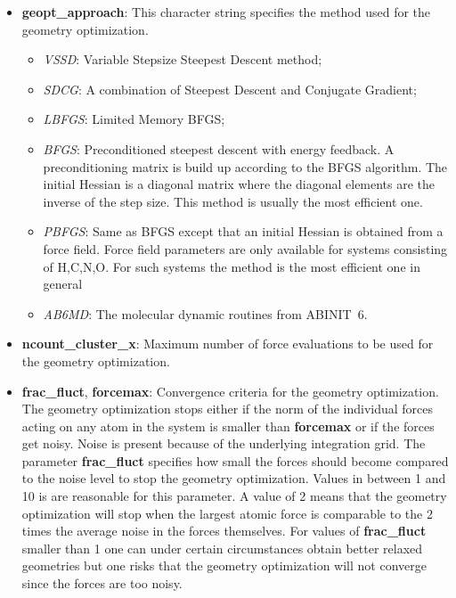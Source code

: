 \documentclass[a4paper,11pt]{report}
\begin{document}
\begin{itemize}
\item {\bf geopt\_approach}: This character string specifies the method used for the geometry optimization.
      \begin{itemize}
      \item  \emph{VSSD}:  Variable Stepsize Steepest Descent method;
      \item  \emph{SDCG}: A combination of Steepest Descent and Conjugate Gradient;
      \item  \emph{LBFGS}: Limited Memory BFGS;
      \item  \emph{BFGS}: Preconditioned steepest descent with energy feedback.
                          A preconditioning matrix is build up according to the  BFGS algorithm.
                          The initial Hessian is a diagonal matrix where the diagonal elements are the 
                          inverse of the step size. This method is usually the most efficient one.
      \item  \emph{PBFGS}: Same as BFGS except that an initial Hessian is obtained from a force field.
                           Force field parameters are only available for systems consisting of H,C,N,O.
                           For such systems the method is the most efficient one in general
      \item  \emph{AB6MD}: The molecular dynamic routines from ABINIT~6.
      \end{itemize}
\item {\bf  ncount\_cluster\_x}: Maximum number of force evaluations to be used for the geometry optimization.
\item {\bf frac\_fluct}, {\bf forcemax}: Convergence criteria for the geometry optimization. 
      The geometry optimization stops either 
      if the norm of the individual forces acting on any atom in the system is smaller than {\bf forcemax} 
      or if the forces get noisy. Noise is present because of the underlying integration grid.
      The parameter {\bf frac\_fluct} specifies how small the forces should become 
      compared to the noise level to stop the geometry optimization. 
      Values in between  1 and 10 is are reasonable for this parameter. 
      A value of 2 means that the geometry optimization will stop when 
      the largest atomic force is comparable to the 2 times the average noise in 
      the forces themselves. For values of  {\bf frac\_fluct} 
      smaller than 1 one can under certain circumstances obtain better relaxed geometries but 
      one risks that the geometry optimization will not converge since the forces are too noisy. 

\end{itemize}
\end{document}
